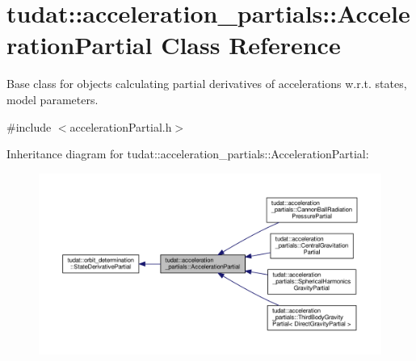\hypertarget{classtudat_1_1acceleration__partials_1_1AccelerationPartial}{}\section{tudat\+:\+:acceleration\+\_\+partials\+:\+:Acceleration\+Partial Class Reference}
\label{classtudat_1_1acceleration__partials_1_1AccelerationPartial}


Base class for objects calculating partial derivatives of accelerations w.\+r.\+t. states, model parameters.  




{\ttfamily \#include $<$acceleration\+Partial.\+h$>$}



Inheritance diagram for tudat\+:\+:acceleration\+\_\+partials\+:\+:Acceleration\+Partial\+:
\nopagebreak
\begin{figure}[H]
\begin{center}
\leavevmode
\includegraphics[width=350pt]{classtudat_1_1acceleration__partials_1_1AccelerationPartial__inherit__graph}
\end{center}
\end{figure}


